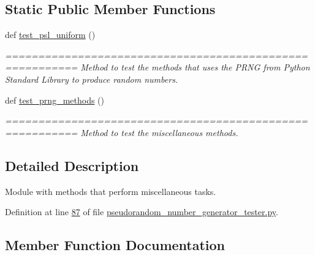 \subsection*{Static Public Member Functions}
\begin{DoxyCompactItemize}
\item 
def \hyperlink{classrandom__process__models_1_1pseudorandom__number__generator__tester_1_1prng__tester_a5597ea984257dcd64376064fda82385d}{test\+\_\+psl\+\_\+uniform} ()
\begin{DoxyCompactList}\small\item\em ========================================================= Method to test the methods that uses the P\+R\+N\+G from Python Standard Library to produce random numbers. \end{DoxyCompactList}\item 
def \hyperlink{classrandom__process__models_1_1pseudorandom__number__generator__tester_1_1prng__tester_aff9e5a07e94168e1eabd25b7f3a4eb32}{test\+\_\+prng\+\_\+methods} ()
\begin{DoxyCompactList}\small\item\em ========================================================= Method to test the miscellaneous methods. \end{DoxyCompactList}\end{DoxyCompactItemize}


\subsection{Detailed Description}
Module with methods that perform miscellaneous tasks. 



Definition at line \hyperlink{pseudorandom__number__generator__tester_8py_source_l00087}{87} of file \hyperlink{pseudorandom__number__generator__tester_8py_source}{pseudorandom\+\_\+number\+\_\+generator\+\_\+tester.\+py}.



\subsection{Member Function Documentation}
\hypertarget{classrandom__process__models_1_1pseudorandom__number__generator__tester_1_1prng__tester_aff9e5a07e94168e1eabd25b7f3a4eb32}{}

